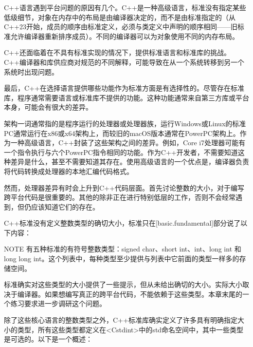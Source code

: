 
C++语言遇到平台问题的原因有几个。C++是一种高级语言，标准没有指定某些低级细节，对象在内存中的布局是由编译器决定的，而不是由标准指定的（从C++23开始，成员的顺序由标准定义，必须与类定义中声明的顺序相同——旧标准允许编译器重新排序成员）。不同的编译器可以为对象使用不同的内存布局。

C++还面临着在不具有标准实现的情况下，提供标准语言和标准库的挑战。C++编译器和库供应商对规范的不同解释，可能导致在从一个系统转移到另一个系统时出现问题。

最后，C++在选择语言提供哪些功能作为标准方面是有选择性的。尽管存在标准库，程序通常需要语言或标准库不提供的功能。这种功能通常来自第三方库或平台本身，可能会有很大的差异。


架构一词通常指的是程序运行的处理器或处理器族，运行Windows或Linux的标准PC通常运行在x86或x64架构上，而较旧的macOS版本通常在PowerPC架构上。作为一种高级语言，C++封装了这些架构之间的差异。例如，Core i7处理器可能有一个指令执行与六个PowerPC指令相同的功能。作为C++开发者，不需要知道这种差异是什么，甚至不需要知道其存在。使用高级语言的一个优点是，编译器负责将代码转换成处理器的本地汇编代码格式。

然而，处理器差异有时会上升到C++代码层面。首先讨论整数的大小，对于编写跨平台代码是很重要的。其他的除非正在进行特别低层的工作，否则不会经常遇到，但仍应该知道它们的存在。


C++标准没有定义整数类型的确切大小，标准只在[basic.fundamental]部分说了以下内容：

\begin{myNotic}{NOTE}
有五种标准的有符号整数类型：signed char、short int、int、long int 和 long long int。这个列表中，每种类型至少提供与列表中它前面的类型一样多的存储空间。
\end{myNotic}

标准确实对这些类型的大小提供了一些提示，但从未给出确切的大小。实际大小取决于编译器。如果想编写真正的跨平台代码，不能依赖于这些类型。本章末尾的一个练习要求进一步调研这个问题。

除了这些核心语言的整数类型之外，C++标准库确实定义了许多具有明确指定大小的类型，所有这些类型都定义在<Cstdint>中的std命名空间中，其中一些类型是可选的。以下是一个概述：


